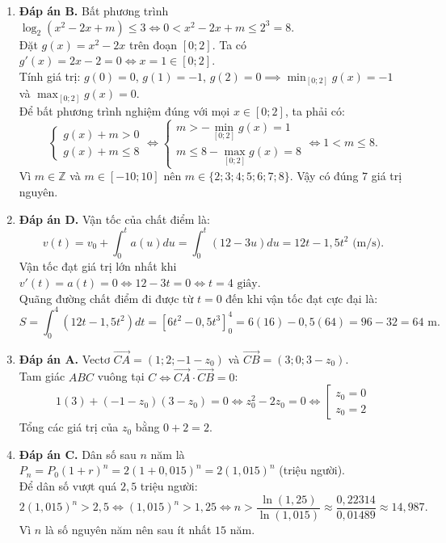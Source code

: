 \documentclass[12pt,a4paper]{article}
\begin{document}
\begin{enumerate}[label=\textbf{Câu \arabic*:}, leftmargin=*]
\item \textbf{Đáp án B.}
Bất phương trình $\log_2(x^2 - 2x + m) \le 3 \iff 0 < x^2 - 2x + m \le 2^3 = 8$.\\
Đặt $g(x) = x^2 - 2x$ trên đoạn $[0; 2]$. Ta có $g'(x) = 2x - 2 = 0 \iff x = 1 \in [0; 2]$.\\
Tính giá trị: $g(0) = 0$, $g(1) = -1$, $g(2) = 0 \implies \min_{[0; 2]} g(x) = -1$ và $\max_{[0; 2]} g(x) = 0$.\\
Để bất phương trình nghiệm đúng với mọi $x \in [0; 2]$, ta phải có:
$$\begin{cases} g(x) + m > 0 \\ g(x) + m \le 8 \end{cases} \iff \begin{cases} m > -\min_{[0; 2]} g(x) = 1 \\ m \le 8 - \max_{[0; 2]} g(x) = 8 \end{cases} \iff 1 < m \le 8.$$
Vì $m \in \mathbb{Z}$ và $m \in [-10; 10]$ nên $m \in \{2; 3; 4; 5; 6; 7; 8\}$. Vậy có đúng $7$ giá trị nguyên.

\item \textbf{Đáp án D.}
Vận tốc của chất điểm là:
$$v(t) = v_0 + \int_0^t a(u) du = \int_0^t (12 - 3u) du = 12t - 1{,}5t^2\text{ (m/s)}.$$
Vận tốc đạt giá trị lớn nhất khi $v'(t) = a(t) = 0 \iff 12 - 3t = 0 \iff t = 4\text{ giây}$.\\
Quãng đường chất điểm đi được từ $t = 0$ đến khi vận tốc đạt cực đại là:
$$S = \int_0^4 (12t - 1{,}5t^2) dt = \left[ 6t^2 - 0{,}5t^3 \right]_0^4 = 6(16) - 0{,}5(64) = 96 - 32 = 64\text{ m}.$$

\item \textbf{Đáp án A.}
Vectơ $\overrightarrow{CA} = (1; 2; -1 - z_0)$ và $\overrightarrow{CB} = (3; 0; 3 - z_0)$.\\
Tam giác $ABC$ vuông tại $C \iff \overrightarrow{CA} \cdot \overrightarrow{CB} = 0$:
$$1(3) + (-1 - z_0)(3 - z_0) = 0 \iff z_0^2 - 2z_0 = 0 \iff \left[\begin{aligned} z_0 = 0 \\ z_0 = 2 \end{aligned}\right.$$
Tổng các giá trị của $z_0$ bằng $0 + 2 = 2$.

\item \textbf{Đáp án C.}
Dân số sau $n$ năm là $P_n = P_0 (1 + r)^n = 2(1 + 0{,}015)^n = 2(1{,}015)^n$ (triệu người).\\
Để dân số vượt quá $2{,}5$ triệu người:
$$2(1{,}015)^n > 2{,}5 \iff (1{,}015)^n > 1{,}25 \iff n > \dfrac{\ln(1{,}25)}{\ln(1{,}015)} \approx \dfrac{0{,}22314}{0{,}01489} \approx 14{,}987.$$
Vì $n$ là số nguyên năm nên sau ít nhất $15$ năm.


\end{enumerate}
\end{document}
